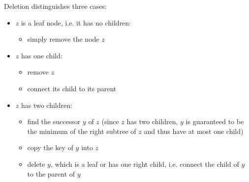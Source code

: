 Deletion distinguishes three cases:
\begin{itemize}[before={\parskip=0pt},nosep]
  \item \(z\) is a leaf node, i.e. it has no children:
    \begin{itemize}[before={\parskip=0pt},nosep]
      \item simply remove the node \(z\)
    \end{itemize}
  \item \(z\) has one child:
    \begin{itemize}[before={\parskip=0pt},nosep]
      \item remove \(z\)
      \item connect its child to its parent
    \end{itemize}
  \item \(z\) has two children:
    \begin{itemize}[before={\parskip=0pt},nosep]
      \item find the successor \(y\) of \(z\) (since \(z\) has two children, \(y\) is guaranteed to be the minimum of the right subtree of \(z\) and thus have at most one child)
      \item copy the key of \(y\) into \(z\)\nopagebreak
      \item delete \(y\), which is a leaf or has one right child, i.e. connect the child of \(y\) to the parent of \(y\)
    \end{itemize}
\end{itemize}

